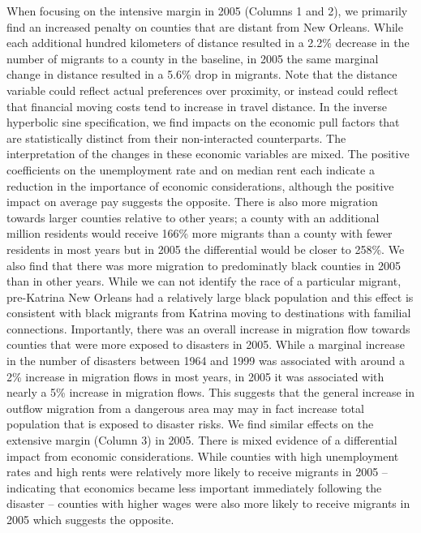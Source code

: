 \documentclass[]{article}
\begin{document}
When focusing on the intensive margin in 2005 (Columns 1 and 2), we
primarily find an increased penalty on counties that are distant from
New Orleans. While each additional hundred kilometers of distance
resulted in a 2.2\% decrease in the number of migrants to a county in
the baseline, in 2005 the same marginal change in distance resulted in a
5.6\% drop in migrants. Note that the distance variable could reflect
actual preferences over proximity, or instead could reflect that
financial moving costs tend to increase in travel distance. In the
inverse hyperbolic sine specification, we find impacts on the economic
pull factors that are statistically distinct from their non-interacted
counterparts. The interpretation of the changes in these economic
variables are mixed. The positive coefficients on the unemployment rate
and on median rent each indicate a reduction in the importance of
economic considerations, although the positive impact on average pay
suggests the opposite. There is also more migration towards larger
counties relative to other years; a county with an additional million
residents would receive 166\% more migrants than a county with fewer
residents in most years but in 2005 the differential would be closer to
258\%. We also find that there was more migration to predominatly black
counties in 2005 than in other years. While we can not identify the race
of a particular migrant, pre-Katrina New Orleans had a relatively large
black population and this effect is consistent with black migrants from
Katrina moving to destinations with familial connections. Importantly,
there was an overall increase in migration flow towards counties that
were more exposed to disasters in 2005. While a marginal increase in the
number of disasters between 1964 and 1999 was associated with around a
2\% increase in migration flows in most years, in 2005 it was associated
with nearly a 5\% increase in migration flows. This suggests that the
general increase in outflow migration from a dangerous area may may in
fact increase total population that is exposed to disaster risks. We
find similar effects on the extensive margin (Column 3) in 2005. There
is mixed evidence of a differential impact from economic considerations.
While counties with high unemployment rates and high rents were
relatively more likely to receive migrants in 2005 -- indicating that
economics became less important immediately following the disaster --
counties with higher wages were also more likely to receive migrants in
2005 which suggests the opposite.
\end{document}
